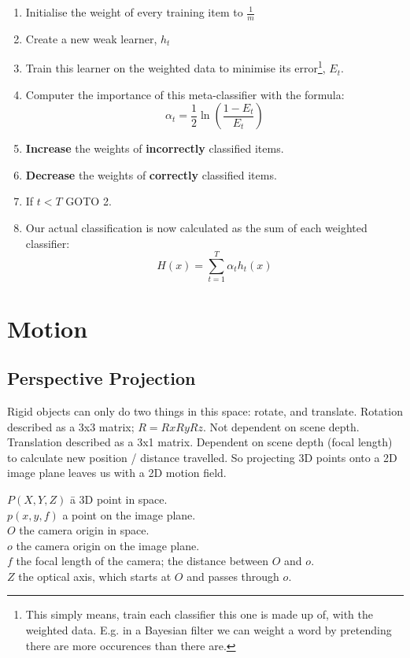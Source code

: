 \documentclass{article}
\begin{document}
        \begin{enumerate}
            \item Initialise the weight of every training item to $\frac{1}{m}$
            \item Create a new weak learner, $h_t$
            \item Train this learner on the weighted data to minimise its error\footnote{This simply means, train each classifier this one is made up of, with the weighted data. E.g. in a Bayesian filter we can weight a word by pretending there are more occurences than there are.}, $E_t$.
            \item Computer the importance of this meta-classifier with the formula:
                $$ \alpha_t = \frac{1}{2} \ln{\left (\frac{1-E_t}{E_t}\right )}$$
            \item \textbf{Increase} the weights of \textbf{incorrectly} classified items.
            \item \textbf{Decrease} the weights of \textbf{correctly} classified items.
            \item If $t < T$ GOTO 2.
            \item Our actual classification is now calculated as the sum of each weighted classifier:
                $$ H(x) = \sum\limits_{t=1}^T \alpha_t h_t(x) $$
        \end{enumerate}

\section{Motion}
    \subsection{Perspective Projection}
        Rigid objects can only do two things in this space: rotate, and translate.
        Rotation described as a 3x3 matrix; $R = Rx Ry Rz$. Not dependent on scene depth.
        Translation described as a 3x1 matrix. Dependent on scene depth (focal length) to calculate new position / distance travelled.
        So projecting 3D points onto a 2D image plane leaves us with a 2D motion field.
        
        \begin{tabbing}
            $P(X,Y,Z)$ \quad \= a 3D point in space.\\
            $p(x,y,f)$ \> a point on the image plane.\\
            $O$ \> the camera origin in space.\\
            $o$ \> the camera origin on the image plane.\\
            $f$ \> the focal length of the camera; the distance between $O$ and $o$.\\
            $Z$ \> the optical axis, which starts at $O$ and passes through $o$.\\
        \end{tabbing}
        
\end{document}
